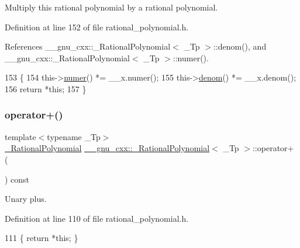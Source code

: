 Multiply this rational polynomial by a rational polynomial. 

Definition at line 152 of file rational\+\_\+polynomial.\+h.



References \+\_\+\+\_\+gnu\+\_\+cxx\+::\+\_\+\+Rational\+Polynomial$<$ \+\_\+\+Tp $>$\+::denom(), and \+\_\+\+\_\+gnu\+\_\+cxx\+::\+\_\+\+Rational\+Polynomial$<$ \+\_\+\+Tp $>$\+::numer().


\begin{DoxyCode}
153       \{
154         this->\hyperlink{class____gnu__cxx_1_1__RationalPolynomial_aa42ac2f6c2368cae05ba3a3cebf0fa24}{numer}() *= \_\_x.numer();
155         this->\hyperlink{class____gnu__cxx_1_1__RationalPolynomial_a05e84913ccfddcf6fcbfe623cb56c937}{denom}() *= \_\_x.denom();
156         \textcolor{keywordflow}{return} *\textcolor{keyword}{this};
157       \}
\end{DoxyCode}
\mbox{\label{class____gnu__cxx_1_1__RationalPolynomial_af027ee02f3bcd373e420eacec639a596}} 
\subsubsection{\texorpdfstring{operator+()}{operator+()}}
{\footnotesize\ttfamily template$<$typename \+\_\+\+Tp$>$ \\
\hyperlink{class____gnu__cxx_1_1__RationalPolynomial}{\+\_\+\+Rational\+Polynomial} \hyperlink{class____gnu__cxx_1_1__RationalPolynomial}{\+\_\+\+\_\+gnu\+\_\+cxx\+::\+\_\+\+Rational\+Polynomial}$<$ \+\_\+\+Tp $>$\+::operator+ (\begin{DoxyParamCaption}{ }\end{DoxyParamCaption}) const\hspace{0.3cm}{\ttfamily [inline]}}

Unary plus. 

Definition at line 110 of file rational\+\_\+polynomial.\+h.


\begin{DoxyCode}
111       \{ \textcolor{keywordflow}{return} *\textcolor{keyword}{this}; \}
\end{DoxyCode}
\mbox{\label{class____gnu__cxx_1_1__RationalPolynomial_a04b822ad014e4c38bcaf609b48176c13}} 
